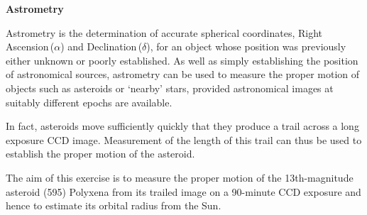\pagestyle{myheadings}
\renewcommand\baselinestretch{1.0}
\setcounter{page}{1}
\begin{center}
{\Huge \bf Astrometry}
\end{center}

Astrometry is the determination of accurate spherical coordinates, Right Ascension\,($\alpha$) and Declination\,($\delta$), for an object whose position was previously either unknown or poorly established. As well as simply establishing the position of astronomical sources, astrometry can be used to measure the proper motion of objects such as asteroids or `nearby' stars, provided astronomical images at suitably different  epochs are available. 

In fact, asteroids move sufficiently quickly that they produce a trail across a long exposure CCD image. Measurement of the length of this trail can thus be used to establish the proper motion of the asteroid.

The aim of this exercise is to measure the proper motion of the \setcounter{page}{1}13th-magnitude asteroid (595) Polyxena from its trailed image on a 90-minute CCD exposure and hence to estimate its orbital radius from the Sun.


